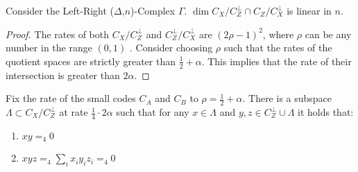 \begin{claim}
  Consider the Left-Right ($\Delta$,$n$)-Complex $\Gamma$. $\dim
  C_{X}/C_{Z}^{\perp} \cap C_{Z} / C_{X}^{\perp}$ is linear in $n$.
\end{claim}
\begin{proof}
  The rates of both $C_{X}/C_{Z}^{\perp}$ and $C_{Z}^{\perp}/C_{X}^{\perp}$ are
  $(2\rho-1)^{2}$, where $\rho$ can be any number in the range $(0,1)$
  \cite{leverrier2022quantum}. Consider choosing $\rho$ such that the rates of
  the quotient spaces are strictly greater than $\frac{1}{2} + \alpha$. This
  implies that the rate of their intersection is greater than $2\alpha$.
\end{proof}
\begin{corollary}
  Fix the rate of the small codes $C_{A}$ and $C_{B}$ to $\rho = \frac{1}{2} +
  \alpha$.  There is a subspace $\Lambda \subset C_{X}/C_{Z}^{\perp}$ at rate
  $\frac{1}{4} \cdot  2\alpha$ such that for any $x \in \Lambda$ and $y,z \in
  C_{Z}^{\perp} \cup \Lambda$ it holds that: %
  \begin{enumerate}
    \item $xy =_4 0 $
    \item $xyz =_4 \sum_{i}x_{i}y_{i}z_{i} =_4  0$
  \end{enumerate}
\end{corollary}

